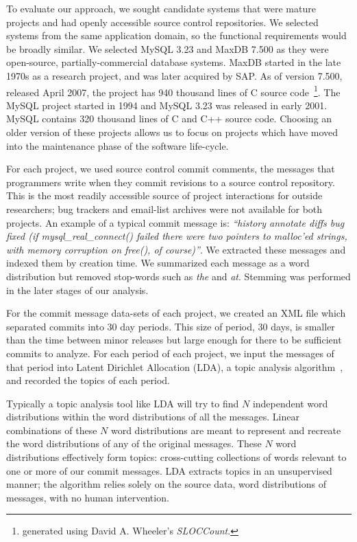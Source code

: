 \documentclass[]{sig-alternate}
\begin{document}
To evaluate our approach, we sought candidate systems that were mature projects and had openly accessible source control repositories. 
We selected systems from the same application domain, so the functional requirements would be broadly similar. 
We selected MySQL 3.23 and MaxDB 7.500 as they were open-source, partially-commercial database systems. 
MaxDB started in the late 1970s as a research project, and was later acquired by SAP. 
As of version 7.500, released April 2007, the project has 940 thousand lines of C source code~\footnote{generated using David A. Wheeler's \emph{SLOCCount}.}. 
The MySQL project started in 1994 and MySQL 3.23 was released in early 2001. 
MySQL contains 320 thousand lines of C and C++ source code.  
Choosing an older version of these projects allows us to focus on projects which have moved into the maintenance phase of the software life-cycle.

For each project, we used source control commit comments, the messages that programmers write when they commit revisions to a source control repository. 
This is the most readily accessible source of project interactions for outside researchers; bug trackers and email-list archives were not available for both projects. 
An example of a typical commit message is: \textit{``history annotate diffs bug fixed (if mysql\-\_real\-\_connect() failed there were two pointers to malloc'ed strings, with memory corruption on free(), of course)''}. 
We extracted these messages and indexed them by creation time. 
We summarized each message as a word distribution but removed stop-words such as \emph{the} and \emph{at}. 
Stemming was performed in the later stages of our analysis. %

For the commit message data-sets of each project, we created an XML file which separated commits into 30 day periods. 
This size of period, 30 days, is smaller than the time between minor releases but large enough for there to be sufficient commits to analyze. 
For each period of each project, we input the messages of that period into Latent Dirichlet Allocation (LDA), a topic analysis algorithm~\cite{Blei2003}, and recorded the topics of each period.

Typically a topic analysis tool like LDA will try to find $N$ independent word distributions within the word distributions of all the messages. 
Linear combinations of these $N$ word distributions are meant to represent and recreate the word distributions of any of the original messages. 
These $N$ word distributions effectively form topics: cross-cutting collections of words relevant to one or more of our commit messages. 
LDA extracts topics in an unsupervised manner; the algorithm relies solely on the source data, word distributions of messages, with no human intervention.
\end{document}
